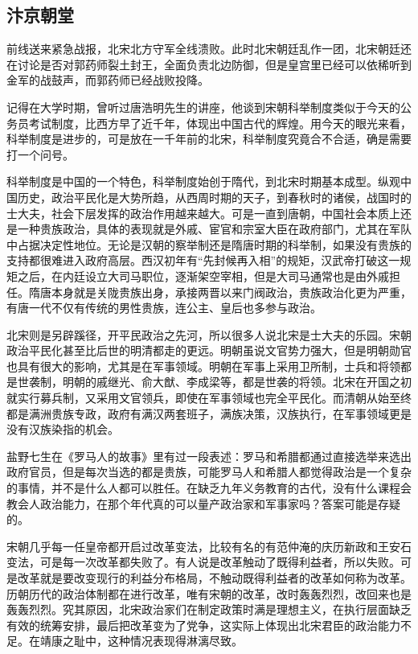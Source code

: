 \documentclass[
]{book}
\begin{document}
\hypertarget{ux6c74ux4eacux671dux5802}{%
\subsection{汴京朝堂}\label{ux6c74ux4eacux671dux5802}}

前线送来紧急战报，北宋北方守军全线溃败。此时北宋朝廷乱作一团，北宋朝廷还在讨论是否对郭药师裂土封王，全面负责北边防御，但是皇宫里已经可以依稀听到金军的战鼓声，而郭药师已经战败投降。

记得在大学时期，曾听过唐浩明先生的讲座，他谈到宋朝科举制度类似于今天的公务员考试制度，比西方早了近千年，体现出中国古代的辉煌。用今天的眼光来看，科举制度是进步的，可是放在一千年前的北宋，科举制度究竟合不合适，确是需要打一个问号。

科举制度是中国的一个特色，科举制度始创于隋代，到北宋时期基本成型。纵观中国历史，政治平民化是大势所趋，从西周时期的天子，到春秋时的诸侯，战国时的士大夫，社会下层发挥的政治作用越来越大。可是一直到唐朝，中国社会本质上还是一种贵族政治，具体的表现就是外戚、宦官和宗室大臣在政府部门，尤其在军队中占据决定性地位。无论是汉朝的察举制还是隋唐时期的科举制，如果没有贵族的支持都很难进入政府高层。西汉初年有``先封候再入相''的规矩，汉武帝打破这一规矩之后，在内廷设立大司马职位，逐渐架空宰相，但是大司马通常也是由外戚担任。隋唐本身就是关陇贵族出身，承接两晋以来门阀政治，贵族政治化更为严重，有唐一代不仅有传统的男性贵族，连公主、皇后也多参与政治。

北宋则是另辟蹊径，开平民政治之先河，所以很多人说北宋是士大夫的乐园。宋朝政治平民化甚至比后世的明清都走的更远。明朝虽说文官势力强大，但是明朝勋官也具有很大的影响，尤其是在军事领域。明朝在军事上采用卫所制，士兵和将领都是世袭制，明朝的戚继光、俞大猷、李成梁等，都是世袭的将领。北宋在开国之初就实行募兵制，又采用文官领兵，即使在军事领域也完全平民化。而清朝从始至终都是满洲贵族专政，政府有满汉两套班子，满族决策，汉族执行，在军事领域更是没有汉族染指的机会。

盐野七生在《罗马人的故事》里有过一段表述：罗马和希腊都通过直接选举来选出政府官员，但是每次当选的都是贵族，可能罗马人和希腊人都觉得政治是一个复杂的事情，并不是什么人都可以胜任。在缺乏九年义务教育的古代，没有什么课程会教会人政治能力，在那个年代真的可以量产政治家和军事家吗？答案可能是存疑的。

宋朝几乎每一任皇帝都开启过改革变法，比较有名的有范仲淹的庆历新政和王安石变法，可是每一次改革都失败了。有人说是改革触动了既得利益者，所以失败。可是改革就是要改变现行的利益分布格局，不触动既得利益者的改革如何称为改革。历朝历代的政治体制都在进行改革，唯有宋朝的改革，改时轰轰烈烈，改回来也是轰轰烈烈。究其原因，北宋政治家们在制定政策时满是理想主义，在执行层面缺乏有效的统筹安排，最后把改革变为了党争，这实际上体现出北宋君臣的政治能力不足。在靖康之耻中，这种情况表现得淋漓尽致。
\end{document}
